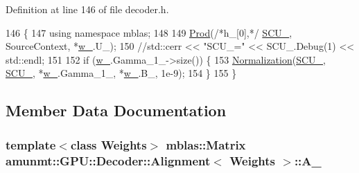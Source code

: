 Definition at line 146 of file decoder.\+h.


\begin{DoxyCode}
146                                                     \{
147           \textcolor{keyword}{using namespace }mblas;
148 
149           \hyperlink{namespaceamunmt_1_1GPU_1_1mblas_a463b2de180e8ab66bae53d1f8c5bc011}{Prod}(\textcolor{comment}{/*h\_[0],*/} \hyperlink{classamunmt_1_1GPU_1_1Decoder_1_1Alignment_ac209ca675c6170b4eb433d4ec323ed37}{SCU\_}, SourceContext, *\hyperlink{classamunmt_1_1GPU_1_1Decoder_1_1Alignment_a76259ec6506c944eb14b820b507be817}{w\_}.U\_);
150           \textcolor{comment}{//std::cerr << "SCU\_=" << SCU\_.Debug(1) << std::endl;}
151 
152           \textcolor{keywordflow}{if} (\hyperlink{classamunmt_1_1GPU_1_1Decoder_1_1Alignment_a76259ec6506c944eb14b820b507be817}{w\_}.Gamma\_1\_->size()) \{
153             \hyperlink{namespaceamunmt_1_1GPU_1_1mblas_ae50f34596c0fcc0aa93e717edcd66379}{Normalization}(\hyperlink{classamunmt_1_1GPU_1_1Decoder_1_1Alignment_ac209ca675c6170b4eb433d4ec323ed37}{SCU\_}, \hyperlink{classamunmt_1_1GPU_1_1Decoder_1_1Alignment_ac209ca675c6170b4eb433d4ec323ed37}{SCU\_}, *\hyperlink{classamunmt_1_1GPU_1_1Decoder_1_1Alignment_a76259ec6506c944eb14b820b507be817}{w\_}.Gamma\_1\_, *\hyperlink{classamunmt_1_1GPU_1_1Decoder_1_1Alignment_a76259ec6506c944eb14b820b507be817}{w\_}.B\_, 1e-9);
154           \}
155         \}
\end{DoxyCode}


\subsection{Member Data Documentation}
\subsubsection[{\texorpdfstring{A\+\_\+}{A_}}]{\setlength{\rightskip}{0pt plus 5cm}template$<$class Weights$>$ {\bf mblas\+::\+Matrix} {\bf amunmt\+::\+G\+P\+U\+::\+Decoder\+::\+Alignment}$<$ {\bf Weights} $>$\+::A\+\_\+\hspace{0.3cm}{\ttfamily [private]}}\hypertarget{classamunmt_1_1GPU_1_1Decoder_1_1Alignment_a1bff435fc752946c60aaec9bdda999cf}{}\label{classamunmt_1_1GPU_1_1Decoder_1_1Alignment_a1bff435fc752946c60aaec9bdda999cf}


